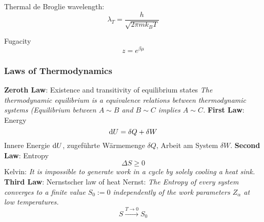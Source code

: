 			\noindent
			Thermal de Broglie wavelength:
			\begin{equation}
				\lambda_T = \frac{h}{\sqrt{2\pi m k_B T}}
			\end{equation} \vsp

			\noindent
			Fugacity
			\begin{equation}
				z = e^{\beta\mu}
			\end{equation} \vsp

		\subsubsection{Laws of Thermodynamics}
			\textbf{Zeroth Law}: Existence and transitivity of equilibrium states\newline
				\indent \emph{The thermodynamic equilibrium is a equivalence relations between thermodynamic systems (Equilibrium between $A \sim B$ and $B \sim C$ implies $A \sim C$.} \nl
			\textbf{First Law}: Energy
				\begin{equation}
					\label{Eq:FirstLawOfThermodynamics}
					\mathrm{d} U = \delta Q + \delta W
				\end{equation}
				\indent Innere Energie $\mathrm{d} U$, zugeführte Wärmemenge $\delta Q$, Arbeit am System $\delta W$. \nl
			\textbf{Second Law}: Entropy
				\begin{equation}
					\label{Eq:SecondLawOfThermodynamics}
					\Delta S	\ge 0
				\end{equation}
				\indent Kelvin: \emph{It is impossible to generate work in a cycle by solely cooling a heat sink.}\nl
			\textbf{Third Law}: Nernstscher law of heat\newline
				\indent Nernst: \emph{The Entropy of every system converges to a finite value $S_0:=0$ independently of the work parameters $Z_\alpha$ at low temperatures.
				\begin{equation}
					S \stackrel{T \rightarrow 0}{\longrightarrow} S_0
					\label{Eq:ThirdLawOfThermodynamics}
				\end{equation}}

